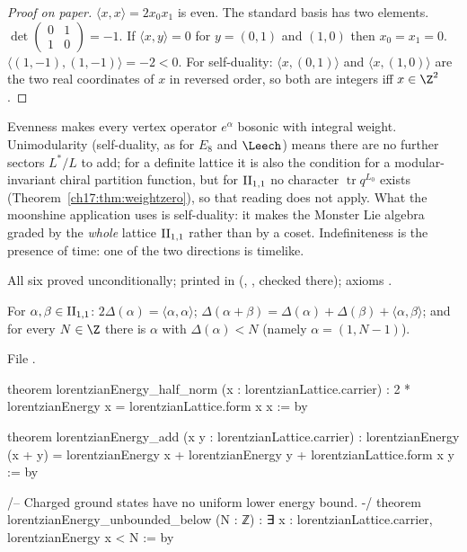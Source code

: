 \begin{proof}[Proof on paper]
$\langle x,x\rangle=2x_0x_1$ is even.  The standard basis has two elements.  $\det\left(\begin{smallmatrix}0&1\\1&0\end{smallmatrix}\right)=-1$.
If $\langle x,y\rangle=0$ for $y=(0,1)$ and $(1,0)$ then $x_0=x_1=0$.  $\langle(1,-1),(1,-1)\rangle=-2<0$.  For
self-duality: $\langle x,(0,1)\rangle$ and $\langle x,(1,0)\rangle$ are the two real coordinates of $x$ in reversed
order, so both are integers iff $x\in\Z^2$.
\end{proof}

\begin{physics}
Evenness makes every vertex operator $e^\alpha$ bosonic with integral weight.  Unimodularity (self-duality, as
for $E_8$ and $\Leech$) means there are no further sectors $L^*/L$ to add; for a definite lattice it is also the
condition for a modular-invariant chiral partition function, but for ${\mathrm{II}_{1,1}}$ no character
$\operatorname{tr}q^{L_0}$ exists (Theorem~\ref{ch17:thm:weightzero}), so that reading does not apply.  What the
moonshine application uses is self-duality: it makes the Monster Lie algebra
graded by the \emph{whole} lattice ${\mathrm{II}_{1,1}}$ rather than by a coset.  Indefiniteness is the presence of
time: one of the two directions is timelike.
\end{physics}

\begin{status}
All six proved unconditionally; printed in 
(, ,  checked there);
axioms .
\end{status}

\begin{theorem}[Energy]\label{ch17:thm:energy}
For $\alpha,\beta\in{\mathrm{II}_{1,1}}$: $2\Delta(\alpha)=\langle\alpha,\alpha\rangle$; $\Delta(\alpha+\beta)=\Delta(\alpha)+\Delta(\beta)+\langle\alpha,\beta\rangle$; and for every
$N\in\Z$ there is $\alpha$ with $\Delta(\alpha)<N$ (namely $\alpha=(1,N-1)$).
\end{theorem}

\noindent File .
\begin{leancode}
theorem lorentzianEnergy_half_norm (x : lorentzianLattice.carrier) :
    2 * lorentzianEnergy x = lorentzianLattice.form x x := by

theorem lorentzianEnergy_add (x y : lorentzianLattice.carrier) :
    lorentzianEnergy (x + y) = lorentzianEnergy x + lorentzianEnergy y +
      lorentzianLattice.form x y := by

/-- Charged ground states have no uniform lower energy bound. -/
theorem lorentzianEnergy_unbounded_below (N : ℤ) :
    ∃ x : lorentzianLattice.carrier, lorentzianEnergy x < N := by
\end{leancode}

